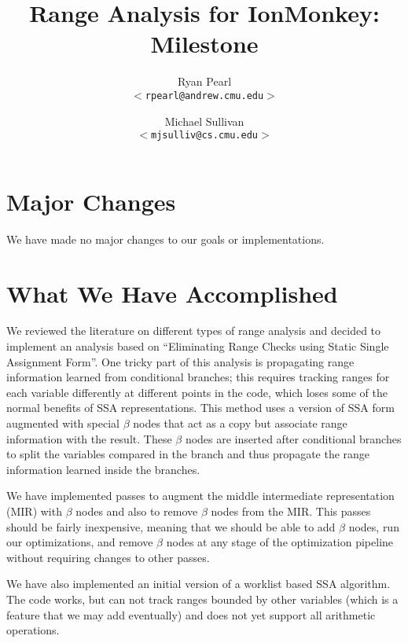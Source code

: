 \documentclass{article}
\begin{document}
\title{\vspace{-1in} \bf Range Analysis for IonMonkey: Milestone}

\author{
Ryan Pearl\\
\texttt{$<$rpearl@andrew.cmu.edu$>$}\\
\and
Michael Sullivan\\
\texttt{$<$mjsulliv@cs.cmu.edu$>$}\\
}

\maketitle

\section{Major Changes}
We have made no major changes to our goals or implementations.


\section{What We Have Accomplished}
We reviewed the literature on different types of range analysis and
decided to implement an analysis based on ``Eliminating Range Checks
using Static Single Assignment Form''. 
One tricky part of this analysis is propagating range information
learned from conditional branches; this requires tracking ranges for
each variable differently at different points in the code, which loses
some of the normal benefits of SSA representations.
This method uses a version of
SSA form augmented with special $\beta$ nodes that act as a copy but
associate range information with the result. These $\beta$ nodes are
inserted after conditional branches to split the variables compared in
the branch and thus propagate the range information learned inside the
branches.

We have implemented passes to augment the middle intermediate
representation (MIR) with $\beta$ nodes and also to remove $\beta$
nodes from the MIR. This passes should be fairly inexpensive, meaning
that we should be able to add $\beta$ nodes, run our optimizations,
and remove $\beta$ nodes at any stage of the optimization pipeline
without requiring changes to other passes.

We have also implemented an initial version of a worklist based SSA
algorithm. The code works, but can not track ranges bounded by other
variables (which is a feature that we may add eventually) and does not yet
support all arithmetic operations.
\end{document}
